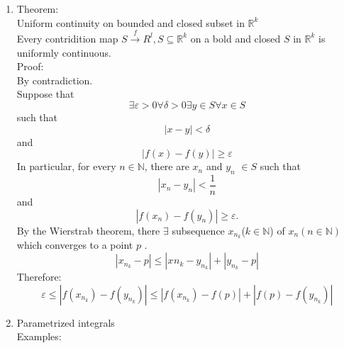 \documentclass[../main.tex]{subfiles}
\begin{document}
\begin{enumerate}
\begin{figure}[H]
  \centering
\begin{tikzpicture}
\end{tikzpicture}
\end{figure}
then
\begin{equation}
\delta = y + \frac{1}{\frac{1}{y} + \varepsilon}
\end{equation}
Is continuous but not uniformly continuous.
\item Theorem:\\
Uniform continuity on bounded and closed subset in $\mathbb{R}^k$\\
Every contridition map $S \xrightarrow{f} R^l, S \subseteq \mathbb{R}^k$ on a bold and closed $S$ in $\mathbb{R}^k$ 
is uniformly continuous.\\
Proof:\\
By contradiction.\\
Suppose that
\begin{equation}
\exists \varepsilon > 0 \forall \delta >0 \exists y \in S \forall x \in S
\end{equation}
such that
\begin{equation}
\left| x - y \right| < \delta
\end{equation}
and
\begin{equation}
\left| f(x) - f(y) \right| \geq \varepsilon
\end{equation}
In particular, for every $n \in \mathbb{N}$, there are $x_n$ and $y_n$ $\in S$ such that
\begin{equation}
\left| x_n - y_n \right| < \frac{1}{n}
\end{equation}
and
\begin{equation}
\left| f(x_n) - f(y_n) \right| \geq \varepsilon.
\end{equation}
By the Wierstrab theorem, there $\exists$ subsequence $x_{n_k}$($k\in \mathbb{N}$) of $x_n(n \in \mathbb{N})$ which converges to a point $p$ .
\begin{equation}
\left| x_{n_k} - p \right| \leq \left|
x_{}{n_k} - y_{n_k}\right| + \left| y_{n_k} - p \right|
\end{equation}
Therefore:
\begin{equation}
\varepsilon \leq \left| f(x_{n_k}) - f(y_{n_k}) \right| \leq \left| f(x_{n_k}) - f(p) \right| + \left| f(p) - f(y_{n_k}) \right|
\end{equation}
\item Parametrized integrals\\
Examples:
\begin{equation}

\end{equation}
\end{enumerate}
\end{document}
